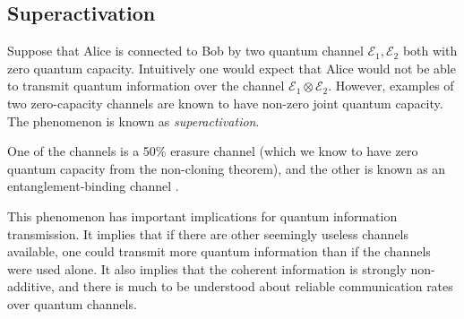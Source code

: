 \subsection{Superactivation}

Suppose that Alice is connected to Bob by two quantum channel $\mathcal{E}_1,\mathcal{E}_2$ both with zero quantum capacity. Intuitively one would expect that Alice would not be able to transmit quantum information over the channel $\mathcal{E}_1\otimes \mathcal{E}_2$. However, examples of two zero-capacity channels are known to have non-zero joint quantum capacity. The phenomenon is known as \textit{superactivation}.

One of the channels is a 50\% erasure channel (which we know to have zero quantum capacity from the non-cloning theorem), and the other is known as an entanglement-binding channel \cite{bib:horodecki2001separability}.

This phenomenon has important implications for quantum information transmission. It implies that if there are other seemingly useless channels available, one could transmit more quantum information than if the channels were used alone. It also implies that the coherent information is strongly non-additive, and there is much to be understood about reliable communication rates over quantum channels.
